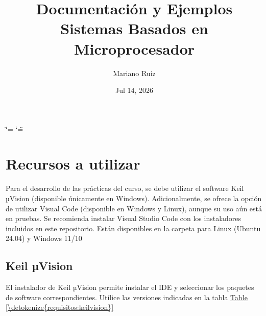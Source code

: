 \documentclass[letterpaper,10pt,english]{sphinxmanual}
\title{Documentación y Ejemplos Sistemas Basados en Microprocesador}
\date{Jul 14, 2026}
\author{Mariano Ruiz}
\begin{document}
\ifdefined\shorthandoff
  \ifnum\catcode`\=\string=\active\shorthandoff{=}\fi
  \ifnum\catcode`\"=\active{}\fi
\fi

\pagestyle{empty}
\sphinxmaketitle
\pagestyle{plain}
\sphinxtableofcontents
\pagestyle{normal}
\label{\detokenize{index::doc}}


\sphinxstepscope


\chapter{Recursos a utilizar}
\label{\detokenize{requisitos:recursos-a-utilizar}}\label{\detokenize{requisitos:requisitos}}\label{\detokenize{requisitos::doc}}
\sphinxAtStartPar
Para el desarrollo de las prácticas del curso, se debe utilizar el software Keil µVision (disponible únicamente en Windows). Adicionalmente, se ofrece la opción de utilizar Visual Code (disponible en Windows y Linux), aunque su uso aún está en pruebas. Se recomienda instalar Visual Studio Code con los instaladores incluidos en este repositorio. Están disponibles en la carpeta  para Linux (Ubuntu 24.04) y Windows 11/10


\section{Keil µVision}
\label{\detokenize{requisitos:keil-vision}}
\sphinxAtStartPar
El instalador de Keil µVision permite instalar el IDE y seleccionar los paquetes de software correspondientes. Utilice las versiones indicadas en la tabla \hyperref[\detokenize{requisitos:keilvision}]{Table \ref{\detokenize{requisitos:keilvision}}}
\end{document}
